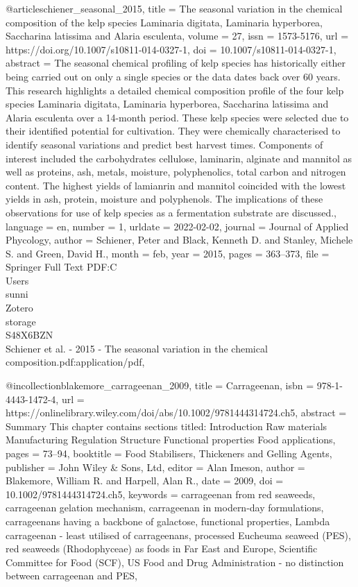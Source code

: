 @article{schiener_seasonal_2015,
	title = {The seasonal variation in the chemical composition of the kelp species {Laminaria} digitata, {Laminaria} hyperborea, {Saccharina} latissima and {Alaria} esculenta},
	volume = {27},
	issn = {1573-5176},
	url = {https://doi.org/10.1007/s10811-014-0327-1},
	doi = {10.1007/s10811-014-0327-1},
	abstract = {The seasonal chemical profiling of kelp species has historically either being carried out on only a single species or the data dates back over 60 years. This research highlights a detailed chemical composition profile of the four kelp species Laminaria digitata, Laminaria hyperborea, Saccharina latissima and Alaria esculenta over a 14-month period. These kelp species were selected due to their identified potential for cultivation. They were chemically characterised to identify seasonal variations and predict best harvest times. Components of interest included the carbohydrates cellulose, laminarin, alginate and mannitol as well as proteins, ash, metals, moisture, polyphenolics, total carbon and nitrogen content. The highest yields of lamianrin and mannitol coincided with the lowest yields in ash, protein, moisture and polyphenols. The implications of these observations for use of kelp species as a fermentation substrate are discussed.},
	language = {en},
	number = {1},
	urldate = {2022-02-02},
	journal = {Journal of Applied Phycology},
	author = {Schiener, Peter and Black, Kenneth D. and Stanley, Michele S. and Green, David H.},
	month = feb,
	year = {2015},
	pages = {363--373},
	file = {Springer Full Text PDF:C\:\\Users\\sunni\\Zotero\\storage\\S48X6BZN\\Schiener et al. - 2015 - The seasonal variation in the chemical composition.pdf:application/pdf},
}

@incollection{blakemore_carrageenan_2009,
	title = {Carrageenan},
	isbn = {978-1-4443-1472-4},
	url = {https://onlinelibrary.wiley.com/doi/abs/10.1002/9781444314724.ch5},
	abstract = {Summary This chapter contains sections titled: Introduction Raw materials Manufacturing Regulation Structure Functional properties Food applications},
	pages = {73--94},
	booktitle = {Food Stabilisers, Thickeners and Gelling Agents},
	publisher = {John Wiley \& Sons, Ltd},
	editor = {Alan Imeson},
	author = {Blakemore, William R. and Harpell, Alan R.},
	date = {2009},
	doi = {10.1002/9781444314724.ch5},
	keywords = {carrageenan from red seaweeds, carrageenan gelation mechanism, carrageenan in modern-day formulations, carrageenans having a backbone of galactose, functional properties, Lambda carrageenan - least utilised of carrageenans, processed Eucheuma seaweed ({PES}), red seaweeds (Rhodophyceae) as foods in Far East and Europe, Scientific Committee for Food ({SCF}), {US} Food and Drug Administration - no distinction between carrageenan and {PES}},
}

